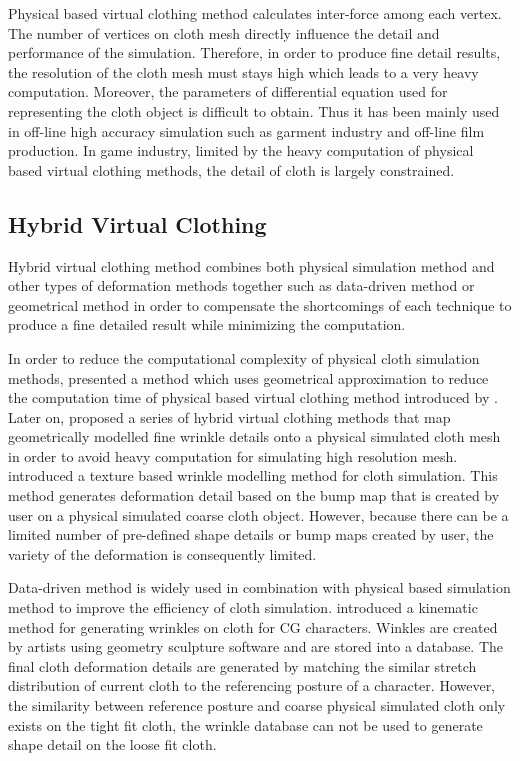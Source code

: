 Physical based virtual clothing method calculates inter-force among each vertex. The number of vertices on cloth mesh directly influence the detail and performance of the simulation. Therefore, in order to produce fine detail results, the resolution of the cloth mesh must stays high which leads to a very heavy computation. Moreover, the parameters of differential equation used for representing the cloth object is difficult to obtain. Thus it has been mainly used in off-line high accuracy simulation such as garment industry and off-line film production. In game industry, limited by the heavy computation of physical based virtual clothing methods, the detail of cloth is largely constrained.

\subsection{Hybrid Virtual Clothing}

Hybrid virtual clothing method combines both physical simulation method and other types of deformation methods together such as data-driven method or geometrical method in order to compensate the shortcomings of each technique to produce a fine detailed result while minimizing the computation. 

In order to reduce the computational complexity of physical cloth simulation methods,  presented a method which uses geometrical approximation to reduce the computation time of physical based virtual clothing method introduced by . Later on,  proposed a series of hybrid virtual clothing methods that map geometrically modelled fine wrinkle details onto a physical simulated cloth mesh in order to avoid heavy computation for simulating high resolution mesh.  introduced a texture based wrinkle modelling method for cloth simulation. This method generates deformation detail based on the bump map that is created by user on a physical simulated coarse cloth object. However, because there can be a limited number of pre-defined shape details or bump maps created by user, the variety of the deformation is consequently limited. 

Data-driven method is widely used in combination with physical based simulation method to improve the efficiency of cloth simulation.  introduced a kinematic method for generating wrinkles on cloth for CG characters. Winkles are created by artists using geometry sculpture software and are stored into a database. The final cloth deformation details are generated by matching the similar stretch distribution of current cloth to the referencing posture of a character. However, the similarity between reference posture and coarse physical simulated cloth only exists on the tight fit cloth, the wrinkle database can not be used to generate shape detail on the loose fit cloth.
 
